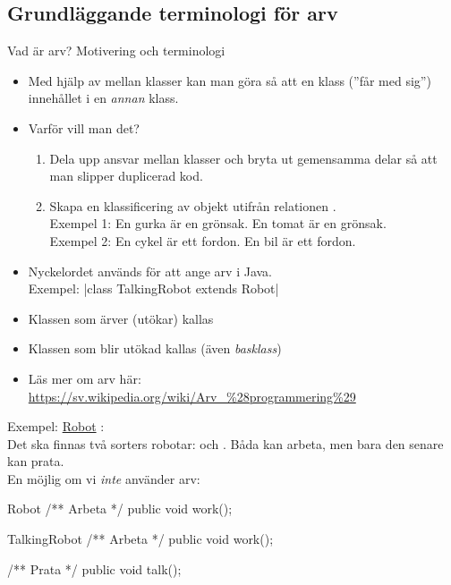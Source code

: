 \documentclass{lecturenotes}
\begin{document}
\subsection{Grundläggande terminologi för arv}
\begin{Slide}{Vad är arv? Motivering och terminologi}\footnotesize
\begin{itemize}
\item Med hjälp av  mellan klasser kan man göra så att en klass  (''får med sig'') innehållet i en \textit{annan} klass.
\item Varför vill man det? 
\begin{enumerate}\footnotesize
\item Dela upp ansvar mellan klasser och bryta ut gemensamma delar så att man slipper duplicerad kod.
\item Skapa en klassificering av objekt utifrån relationen  .  \\ Exempel 1: En gurka är en grönsak. En tomat är en grönsak. \\ Exempel 2: En cykel är ett fordon. En bil är ett fordon. 
\end{enumerate}
\item Nyckelordet  används för att ange arv i Java. \\ Exempel:   \code|class TalkingRobot extends Robot|
\item Klassen som ärver (utökar) kallas 
\item Klassen som blir utökad kallas  (även \textit{basklass})
\item Läs mer om arv  här: \scriptsize \url{https://sv.wikipedia.org/wiki/Arv\_\%28programmering\%29} 
\end{itemize}
\end{Slide}

\begin{Slide}{Exempel: \href{https://www.youtube.com/watch?v=VXa9tXcMhXQ}{Robot}}
: \\ Det ska finnas två sorters robotar:  och . Båda kan arbeta, men bara den senare kan prata.
\\ \vspace{1em}
En möjlig  om vi \textit{inte} använder arv:

\begin{ClassSpec}{Robot}
/** Arbeta */
public void work();
\end{ClassSpec}

\begin{ClassSpec}{TalkingRobot}
/** Arbeta */
public void work();

/** Prata */
public void talk();
\end{ClassSpec}
\end{Slide}
\end{document}
